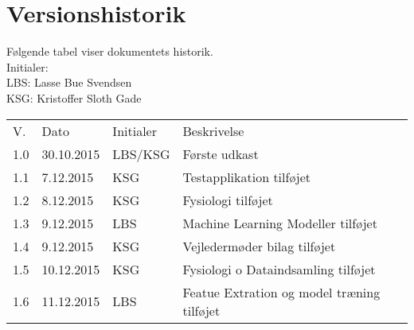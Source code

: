 \documentclass[pdftex, 11pt, a4paper, twoside, danish]{memoir}
\begin{document}
    \begin{titlingpage}
%        
    \end{titlingpage}
    
    
    
    
    \bgroup
	    \hypersetup{linkcolor=black}
	    \tableofcontents*	%
    \egroup
    \section*{Versionshistorik}
    Følgende tabel viser dokumentets historik.\\    
    Initialer:\\
    LBS: Lasse Bue Svendsen\\
    KSG: Kristoffer Sloth Gade
    \bgroup
    \def\arraystretch{1.8}
    \begin{center}
    	\begin{tabular}{lllp{206pt}}
    		\rowcolor{grey} V.	& Dato 		& Initialer & Beskrivelse \\
    		1.0	& 30.10.2015 	& LBS/KSG	& Første udkast\\
    		1.1	& 7.12.2015 	& KSG		& Testapplikation tilføjet\\
    		1.2 & 8.12.2015		& KSG		& Fysiologi tilføjet\\
    		1.3	& 9.12.2015		& LBS		& Machine Learning Modeller tilføjet\\
    		1.4 & 9.12.2015		& KSG		& Vejledermøder bilag tilføjet\\
    		1.5 & 10.12.2015	& KSG		& Fysiologi o Dataindsamling tilføjet\\
    		1.6 & 11.12.2015	& LBS		& Featue Extration og model træning tilføjet
    	\end{tabular}
    \end{center}
    \egroup
    
    
    
    
    
    
    
    
    
    
    
    
    
    
    
    
        
    
    
    
    


    
    \listoftodos
\end{document}

